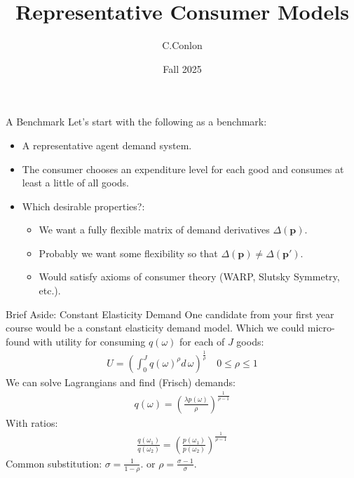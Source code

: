 


\title{Representative Consumer Models}
\author{C.Conlon}
\date{Fall 2025}

\frame{\titlepage}

\begin{frame}{A Benchmark}
Let's start with the following as a benchmark:
\begin{itemize}
\item A \alert{representative agent} demand system.
\item The consumer chooses an \alert{expenditure} level for each good and consumes at least a little of all goods.
\item Which desirable properties?:
\begin{itemize}
\item We want a fully flexible matrix of demand derivatives $\Delta(\mathbf{p})$.
\item Probably we want some flexibility so that $\Delta(\mathbf{p}) \neq \Delta(\mathbf{p'})$.
\item Would satisfy axioms of consumer theory (WARP, Slutsky Symmetry, etc.).
\end{itemize}
\end{itemize}
\end{frame}



\begin{frame}{Brief Aside: Constant Elasticity Demand}
One candidate from your first year course would be a \alert{constant elasticity demand model}. Which we could micro-found with utility for consuming $q(\omega)$ for each of $J$ goods:
\begin{eqnarray*}
U  = \left( \int_{0}^{J} q(\omega)^{\rho} d\, \omega \right)^{\frac{1}{\rho}} \quad 0 \leq \rho \leq 1
\end{eqnarray*}
We can solve Lagrangians and find (Frisch) demands:
\begin{eqnarray*}
q(\omega) = \left( \frac{\lambda p(\omega)}{\rho} \right)^{\frac{1}{\rho-1}}
\end{eqnarray*}
With ratios:
\begin{eqnarray*}
\frac{q(\omega_1)}{q(\omega_2)} = \left( \frac{p(\omega_1)}{p(\omega_2)} \right)^{\frac{1}{\rho-1}}
\end{eqnarray*}
Common substitution: $\sigma = \frac{1}{1-\rho}$. or $\rho = \frac{\sigma-1}{\sigma}$.
\end{frame}


